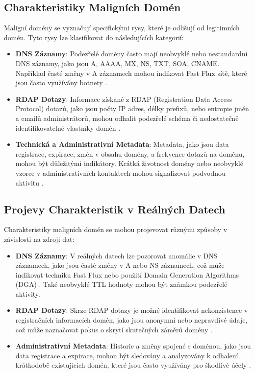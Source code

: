 \subsection{Charakteristiky Maligních Domén}
Maligní domény se vyznačují specifickými rysy, které je odlišují od legitimních domén. Tyto rysy lze klasifikovat do následujících kategorií:

\begin{itemize}
\item \textbf{DNS Záznamy}: Podezřelé domény často mají neobvyklé nebo nestandardní DNS záznamy, jako jsou A, AAAA, MX, NS, TXT, SOA, CNAME. Například časté změny v A záznamech mohou indikovat Fast Flux sítě, které jsou často využívány botnety \cite{silveira2021detection}.


\item \textbf{RDAP Dotazy}: Informace získané z RDAP (Registration Data Access Protocol) dotazů, jako jsou počty IP adres, délky prefixů, nebo entropie jmén a emailů administrátorů, mohou odhalit podezřelé schéma či nedostatečně identifikovatelné vlastníky domén \cite{zhu2020detecting}.

\item \textbf{Technická a Administrativní Metadata}: Metadata, jako jsou data registrace, expirace, změn v obsahu domény, a frekvence dotazů na doménu, mohou být důležitými indikátory. Krátká životnost domény nebo neobvyklé vzorce v administrativních kontaktech mohou signalizovat podvodnou aktivitu \cite{max2020madmax}.


\end{itemize}



\subsection{Projevy Charakteristik v Reálných Datech}

Charakteristiky maligních domén se mohou projevovat různými způsoby v závislosti na zdroji dat:

\begin{itemize}
\item \textbf{DNS Záznamy}: V reálných datech lze pozorovat anomálie v DNS záznamech, jako jsou časté změny v A nebo NS záznamech, což může indikovat techniku Fast Flux nebo použití Domain Generation Algorithms (DGA) \cite{silveira2021detection}. Také neobvyklé TTL hodnoty mohou být známkou podezřelé aktivity.

\item \textbf{RDAP Dotazy}: Skrze RDAP dotazy je možné identifikovat nekonzistence v registračních informacích domén, jako jsou anonymní nebo nepravdivé údaje, což může naznačovat pokus o skrytí skutečných záměrů domény \cite{zhu2020detecting}.

\item \textbf{Administrativní Metadata}: Historie a změny spojené s doménou, jako jsou data registrace a expirace, mohou být sledovány a analyzovány k odhalení krátkodobě existujících domén, které jsou často využívány pro škodlivé účely \cite{max2020madmax}.

\end{itemize}



